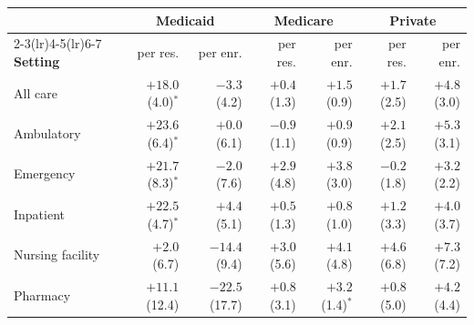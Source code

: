 \begin{tabular}{@{}lrrrrrr@{}}
\toprule
 & \multicolumn{2}{c}{\textbf{Medicaid}} & \multicolumn{2}{c}{\textbf{Medicare}} & \multicolumn{2}{c}{\textbf{Private}} \\
\cmidrule(lr){2-3}\cmidrule(lr){4-5}\cmidrule(lr){6-7}
\textbf{Setting} & per res. & per enr. & per res. & per enr. & per res. & per enr. \\
\midrule
All care & $+18.0$ (4.0)$^{*}$ & $-3.3$ (4.2) & $+0.4$ (1.3) & $+1.5$ (0.9) & $+1.7$ (2.5) & $+4.8$ (3.0) \\
Ambulatory & $+23.6$ (6.4)$^{*}$ & $+0.0$ (6.1) & $-0.9$ (1.1) & $+0.9$ (0.9) & $+2.1$ (2.5) & $+5.3$ (3.1) \\
Emergency & $+21.7$ (8.3)$^{*}$ & $-2.0$ (7.6) & $+2.9$ (4.8) & $+3.8$ (3.0) & $-0.2$ (1.8) & $+3.2$ (2.2) \\
Inpatient & $+22.5$ (4.7)$^{*}$ & $+4.4$ (5.1) & $+0.5$ (1.3) & $+0.8$ (1.0) & $+1.2$ (3.3) & $+4.0$ (3.7) \\
Nursing facility & $+2.0$ (6.7) & $-14.4$ (9.4) & $+3.0$ (5.6) & $+4.1$ (4.8) & $+4.6$ (6.8) & $+7.3$ (7.2) \\
Pharmacy & $+11.1$ (12.4) & $-22.5$ (17.7) & $+0.8$ (3.1) & $+3.2$ (1.4)$^{*}$ & $+0.8$ (5.0) & $+4.2$ (4.4) \\
\bottomrule
\end{tabular}
